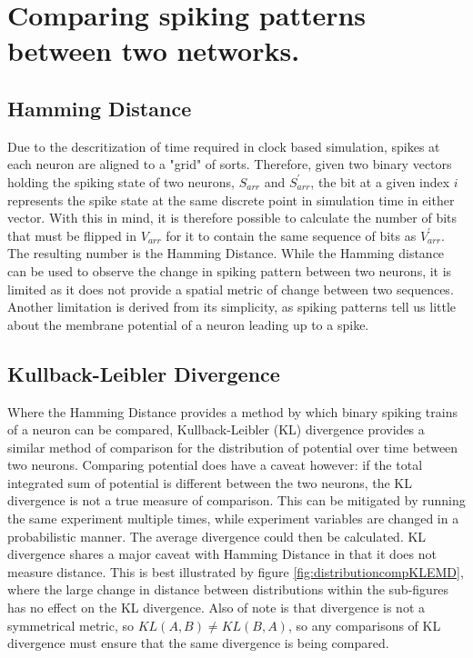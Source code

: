 

\section{Comparing spiking patterns between two networks.}

\subsection{Hamming Distance}
Due to the descritization of time required in clock based simulation, spikes at
each neuron are aligned to a "grid" of sorts. Therefore, given two binary
vectors holding the spiking state of two neurons, $S_{arr}$ and $S^\prime_{arr}$, the bit at a given index $i$ represents
the spike state at the same discrete point in simulation time in either vector.
With this in mind, it is therefore possible to calculate the number of bits
that must be flipped in $V_{arr}$ for it to contain the same sequence of bits as
$V^\prime_{arr}$. The resulting number is the Hamming Distance. While the
Hamming distance can be used to observe the change in spiking pattern between
two neurons, it is limited as it does not provide a spatial metric of change
between two sequences. Another limitation is derived from its simplicity, as
spiking patterns tell us little about the membrane potential of a neuron leading
up to a spike.

\subsection{Kullback-Leibler Divergence}

Where the Hamming Distance provides a method by which binary spiking trains of a
neuron can be compared, Kullback-Leibler (KL) divergence provides a similar
method of comparison for the distribution of potential over time between two
neurons. Comparing potential does have a caveat however: if the total integrated
sum of potential is different between the two neurons, the KL divergence is not
a true measure of comparison. This can be mitigated by running the same
experiment multiple times, while experiment variables are changed in a
probabilistic manner. The average divergence could then be calculated. KL
divergence shares a major caveat with Hamming Distance in that it does not
measure distance. This is best illustrated by figure
\ref{fig:distributioncompKLEMD}, where the large change in distance between
distributions within the sub-figures has no effect on the KL divergence. Also of
note is that divergence is not a symmetrical metric, so $KL(A, B) \neq KL(B,
A)$, so any comparisons of KL divergence must ensure that the same divergence is
being compared.

